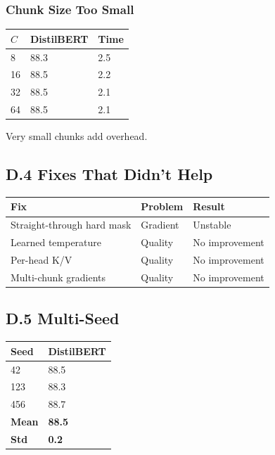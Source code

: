 \subsubsection{Chunk Size Too Small}
\begin{table}[H]
\centering
\small
\begin{tabular}{lll}
\toprule
\textbf{$C$} & \textbf{DistilBERT} & \textbf{Time} \\
\midrule
8 & 88.3 & 2.5 \\
16 & 88.5 & 2.2 \\
32 & 88.5 & 2.1 \\
64 & 88.5 & 2.1 \\
\bottomrule
\end{tabular}
\end{table}

Very small chunks add overhead.

\subsection{D.4 Fixes That Didn't Help}

\begin{table}[H]
\centering
\small
\begin{tabular}{lll}
\toprule
\textbf{Fix} & \textbf{Problem} & \textbf{Result} \\
\midrule
Straight-through hard mask & Gradient & Unstable \\
Learned temperature & Quality & No improvement \\
Per-head K/V & Quality & No improvement \\
Multi-chunk gradients & Quality & No improvement \\
\bottomrule
\end{tabular}
\end{table}

\subsection{D.5 Multi-Seed}

\begin{table}[H]
\centering
\small
\begin{tabular}{ll}
\toprule
\textbf{Seed} & \textbf{DistilBERT} \\
\midrule
42 & 88.5 \\
123 & 88.3 \\
456 & 88.7 \\
\textbf{Mean} & \textbf{88.5} \\
\textbf{Std} & \textbf{0.2} \\
\bottomrule
\end{tabular}
\end{table}

